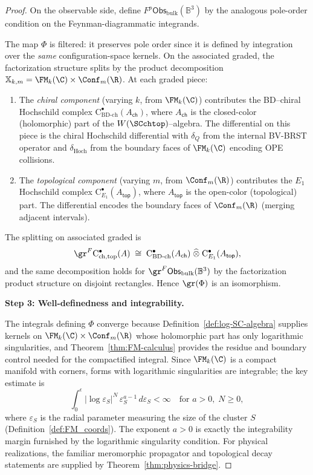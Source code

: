 \begin{proof}
On the observable side, define $F^p \mathsf{Obs}_{\mathrm{bulk}}(\mathbb{B}^3)$ by the analogous pole-order condition on the Feynman-diagrammatic integrands.

The map $\Phi$ is filtered: it preserves pole order since it is defined by integration over the \emph{same} configuration-space kernels. On the associated graded, the factorization structure splits by the product decomposition $\mathbb{X}_{k,m} = \FM_k(\C) \times \Conf_m(\R)$. At each graded piece:
\begin{enumerate}[label=(\roman*)]
\item The \emph{chiral component} (varying $k$, from $\FM_k(\C)$) contributes the BD--chiral Hochschild complex $\mathrm{C}^\bullet_{\mathrm{BD\text{-}ch}}(A_{\mathsf{ch}})$, where $A_{\mathsf{ch}}$ is the closed-color (holomorphic) part of the $W(\SCchtop)$--algebra. The differential on this piece is the chiral Hochschild differential with $\delta_Q$ from the internal BV-BRST operator and $\delta_{\mathrm{Hoch}}$ from the boundary faces of $\FM_k(\C)$ encoding OPE collisions.
\item The \emph{topological component} (varying $m$, from $\Conf_m(\R)$) contributes the $E_1$ Hochschild complex $\mathrm{C}^\bullet_{E_1}(A_{\mathsf{top}})$, where $A_{\mathsf{top}}$ is the open-color (topological) part. The differential encodes the boundary faces of $\Conf_m(\R)$ (merging adjacent intervals).
\end{enumerate}
The splitting on associated graded is
\[
\gr^F \mathrm{C}^\bullet_{\mathrm{ch,top}}(A) \;\cong\; \mathrm{C}^\bullet_{\mathrm{BD\text{-}ch}}(A_{\mathsf{ch}}) \;\widehat\otimes\; \mathrm{C}^\bullet_{E_1}(A_{\mathsf{top}}),
\]
and the same decomposition holds for $\gr^F \mathsf{Obs}_{\mathrm{bulk}}(\mathbb{B}^3)$ by the factorization product structure on disjoint rectangles. Hence $\gr(\Phi)$ is an isomorphism.

\medskip
\textbf{Step 3: Well-definedness and integrability.}

The integrals defining $\Phi$ converge because Definition~\ref{def:log-SC-algebra} supplies kernels on $\FM_k(\C) \times \Conf_m(\R)$ whose holomorphic part has only logarithmic singularities, and Theorem~\ref{thm:FM-calculus} provides the residue and boundary control needed for the compactified integral. Since $\FM_k(\C)$ is a compact manifold with corners, forms with logarithmic singularities are integrable; the key estimate is
\[
\int_0^\epsilon |\log \varepsilon_S|^N \, \varepsilon_S^{a-1} \, d\varepsilon_S < \infty \quad \text{for } a > 0, \; N \geq 0,
\]
where $\varepsilon_S$ is the radial parameter measuring the size of the cluster $S$ (Definition~\ref{def:FM_coords}). The exponent $a > 0$ is exactly the integrability margin furnished by the logarithmic singularity condition. For physical realizations, the familiar meromorphic propagator and topological decay statements are supplied by Theorem~\ref{thm:physics-bridge}.


\end{proof}
